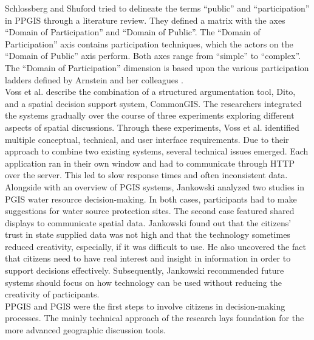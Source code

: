 Schlossberg and Shuford \cite{Schlossberg2005_PPGIS} tried to delineate the terms ``public'' and ``participation'' in PPGIS through a literature review. They defined a matrix with the axes ``Domain of Participation'' and ``Domain of Public''. The ``Domain of Participation'' axis contains participation techniques, which the actors on the ``Domain of Public'' axis perform. Both axes range from ``simple'' to ``complex''. The ``Domain of Participation'' dimension is based upon the various participation ladders defined by Arnstein and her colleagues \cite{Arnstein1969_citizen_participation,Wiedemann1993355,Connor1988_new_ladder}.\\%
Voss et al. \cite{Voss2004_Evolution_PGIS} describe the combination of a structured argumentation tool, Dito, and a spatial decision support system, CommonGIS. The researchers integrated the systems gradually over the course of three experiments exploring different aspects of spatial discussions. Through these experiments, Voss et al. identified multiple conceptual, technical, and user interface requirements. Due to their approach to combine two existing systems, several technical issues emerged. Each application ran in their own window and had to communicate through HTTP over the server. This led to slow response times and often inconsistent data.\\
Alongside with an overview of PGIS systems, Jankowski \cite{Jankowski2005_community_based_pgis} analyzed two studies in PGIS water resource decision-making. In both cases, participants had to make suggestions for water source protection sites. The second case featured shared displays to communicate spatial data. Jankowski found out that the citizens' trust in state supplied data was not high and that the technology sometimes reduced creativity, especially, if it was difficult to use. He also uncovered the fact that citizens need to have real interest and insight in information in order to support decisions effectively. Subsequently, Jankowski recommended future systems should focus on how technology can be used without reducing the creativity of participants.\\
PPGIS and PGIS were the first steps to involve citizens in decision-making processes. The mainly technical approach of the research lays foundation for the more advanced geographic discussion tools.

